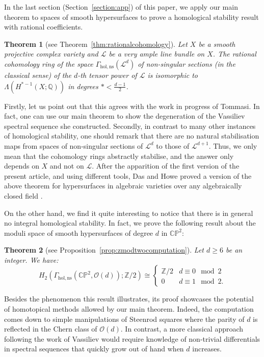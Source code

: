 \documentclass[a4paper]{amsart}
\newcommand{\bQ}{\mathbb Q}
\newcommand{\bZ}{\mathbb Z}
\newcommand{\bC}{\mathbb C}
\newcommand{\bP}{\mathbb P}
\newcommand{\cL}{\mathcal L}
\newcommand{\cO}{\mathcal O}
\theoremstyle{plain}
\newtheorem{theorem}{Theorem}[section]
\theoremstyle{definition}
\begin{document}
In the last section (Section~\ref{section:app}) of this paper, we apply our main theorem to spaces of smooth hypersurfaces to prove a homological stability result with rational coefficients.
\begin{theorem}[see Theorem~\ref{thm:rationalcohomology}]
Let $X$ be a smooth projective complex variety and $\cL$ be a very ample line bundle on $X$. The rational cohomology ring of the space $\Gamma_{\mathrm{hol,ns}}(\cL^d)$ of non-singular sections (in the classical sense) of the $d$-th tensor power of $\cL$ is isomorphic to $\Lambda\left(H^{*-1}(X; \bQ) \right)$ in degrees $* < \frac{d-1}{2}$.
\end{theorem}

Firstly, let us point out that this agrees with the work in progress of Tommasi. In fact, one can use our main theorem to show the degeneration of the Vassiliev spectral sequence she constructed. Secondly, in contrast to many other instances of homological stability, one should remark that there are no natural stabilisation maps from spaces of non-singular sections of $\cL^d$ to those of $\cL^{d+1}$. Thus, we only mean that the cohomology rings abstractly stabilise, and the answer only depends on $X$ and not on $\cL$. After the apparition of the first version of the present article, and using different tools, Das and Howe proved a version of the above theorem for hypersurfaces in algebraic varieties over any algebraically closed field \cite{das_cohomological_2022}.

\bigskip

On the other hand, we find it quite interesting to notice that there is in general no integral homological stability. In fact, we prove the following result about the moduli space of smooth hypersurfaces of degree $d$ in $\bC\bP^2$:
\begin{theorem}[see Proposition~\ref{prop:zmodtwocomputation}]
Let $d \geq 6$ be an integer. We have:
\[
    H_2(\Gamma_{\mathrm{hol,ns}}(\bC\bP^2, \cO(d)); \bZ/2) \cong \begin{cases} \bZ/2 & d \equiv 0 \mod 2 \\ 0 & d \equiv 1 \mod 2. \end{cases}
\]
\end{theorem}
Besides the phenomenon this result illustrates, its proof showcases the potential of homotopical methods allowed by our main theorem. Indeed, the computation comes down to simple manipulations of Steenrod squares where the parity of $d$ is reflected in the Chern class of $\cO(d)$. In contrast, a more classical approach following the work of Vassiliev \cite{vassiliev_how_1999} would require knowledge of non-trivial differentials in spectral sequences that quickly grow out of hand when $d$ increases.
\end{document}
